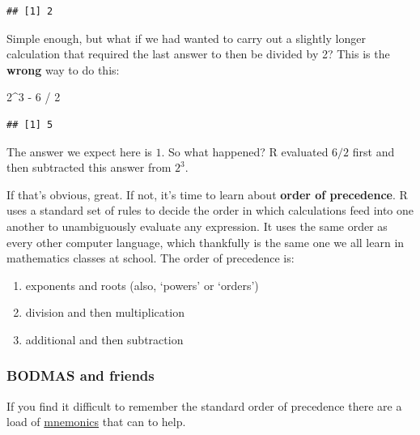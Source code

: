 \documentclass[
]{book}
\newenvironment{Shaded}{\begin{snugshade}}{\end{snugshade}}
\newcommand{\DecValTok}[1]{\textcolor[rgb]{0.00,0.00,0.81}{#1}}
\newcommand{\SpecialCharTok}[1]{\textcolor[rgb]{0.00,0.00,0.00}{#1}}
\newenvironment{greybox}{
  \definecolor{shadecolor}{rgb}{0.95,0.95,0.95}  %
  \color{black}
  \begin{shaded}}
 {\end{shaded}}
\newenvironment{infobox}[1]
  {
  \begin{itemize}
  \renewcommand{\labelitemi}{
    \raisebox{-.7\height}[0pt][0pt]{
      {\setkeys{Gin}{width=3em,keepaspectratio}
        \texttt{[image: images/\#1]}}
    }
  }
  \setlength{\fboxsep}{1em}
  \begin{greybox}
  \item
  }
  {
  \end{greybox}
  \end{itemize}
  }
\begin{document}
\begin{verbatim}
## [1] 2
\end{verbatim}

Simple enough, but what if we had wanted to carry out a slightly longer calculation that required the last answer to then be divided by 2? This is the \textbf{wrong} way to do this:

\begin{Shaded}
\begin{Highlighting}[]
\DecValTok{2}\SpecialCharTok{\^{}}\DecValTok{3} \SpecialCharTok{{-}} \DecValTok{6} \SpecialCharTok{/} \DecValTok{2}
\end{Highlighting}
\end{Shaded}

\begin{verbatim}
## [1] 5
\end{verbatim}

The answer we expect here is \(1\). So what happened? R evaluated \(6/2\) first and then subtracted this answer from \(2^3\).

If that's obvious, great. If not, it's time to learn about \textbf{order of precedence}. R uses a standard set of rules to decide the order in which calculations feed into one another to unambiguously evaluate any expression. It uses the same order as every other computer language, which thankfully is the same one we all learn in mathematics classes at school. The order of precedence is:

\begin{enumerate}
\def\labelenumi{\arabic{enumi}.}
\item
  exponents and roots (also, `powers' or `orders')
\item
  division and then multiplication
\item
  additional and then subtraction
\end{enumerate}

\begin{infobox}{information}

\hypertarget{bodmas-and-friends}{%
\subsubsection*{BODMAS and friends}\label{bodmas-and-friends}}

If you find it difficult to remember the standard order of precedence there are a load of \href{http://en.wikipedia.org/wiki/Order_of_operations\#Mnemonics}{mnemonics} that can to help.

\end{infobox}
\end{document}
